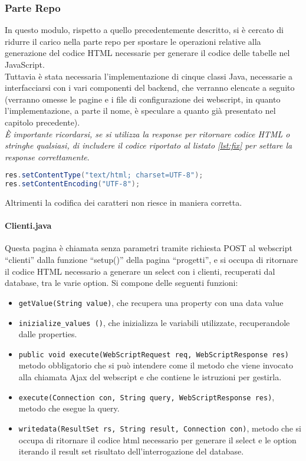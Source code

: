 \subsubsection{Parte Repo}
In questo modulo, rispetto a quello precedentemente descritto, si è cercato di ridurre il carico nella parte repo per spostare le operazioni relative alla generazione del codice HTML necessarie per generare il codice delle tabelle nel JavaScript.\\
Tuttavia è stata necessaria l’implementazione di cinque classi Java, necessarie a interfacciarsi con i vari componenti del backend, che verranno elencate a seguito (verranno omesse le pagine e i file di configurazione dei webscript, in quanto l'implementazione, a parte il nome, è speculare a quanto già presentato nel capitolo precedente).\\
\emph{È importante ricordarsi, se si utilizza la response per ritornare codice HTML o stringhe qualsiasi, di includere il codice riportato al listato \ref{lst:fix} per settare la response correttamente}.
\begin{lstlisting}[language=Java, caption=set dell'encoding,label=lst:fix]
res.setContentType("text/html; charset=UTF-8");
res.setContentEncoding("UTF-8");
\end{lstlisting}
 Altrimenti la codifica dei caratteri non riesce in maniera corretta.
\paragraph{Clienti.java}
Questa pagina è chiamata senza parametri tramite richiesta POST al webscript “clienti” dalla funzione “setup()” della pagina “progetti”, e si occupa di ritornare il codice HTML necessario a generare un select con i clienti, recuperati dal database, tra le varie option.
Si compone delle seguenti funzioni:
\begin{itemize}
\item \texttt{getValue(String value)}, che recupera una property con una data value
\item \texttt{inizialize\_values ()}, che inizializza le variabili utilizzate, recuperandole dalle properties.
\item \texttt{public void execute(WebScriptRequest req, WebScriptResponse res)} metodo obbligatorio che si può intendere come il metodo che viene invocato alla chiamata Ajax del webscript e che contiene le istruzioni per gestirla.
\item \texttt{execute(Connection con, String query, WebScriptResponse res)}, metodo che esegue la query.
\item \texttt{writedata(ResultSet rs, String result, Connection con)}, metodo che si occupa di ritornare il codice html necessario per generare il select e le option iterando il result set risultato dell’interrogazione del database.
\end{itemize}
